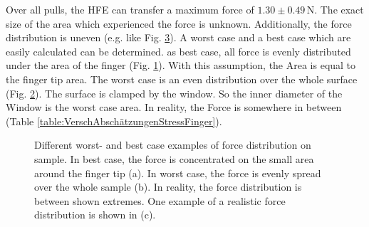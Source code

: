 Over all pulls, the HFE can transfer a maximum force of $1.30\pm0.49\,\si{\newton}$. The exact size of the area which experienced the force is unknown. Additionally, the force distribution is uneven (e.g. like Fig. \ref{fig:ZeichnungBerechnungStress_c}). A worst case and a best case which are easily calculated can be determined. as best case, all force is evenly distributed under the area of the finger (Fig. \ref{fig:ZeichnungBerechnungStress_a}). With this assumption, the Area is equal to the finger tip area. The worst case is an even distribution over the whole surface (Fig. \ref{fig:ZeichnungBerechnungStress_b}). The surface is clamped by the window. So the inner diameter of the Window is the worst case area. In reality, the Force is somewhere in between (Table \ref{table:VerschAbschätzungenStressFinger}).

\begin{figure}[hbt!]
	\centering
	\begin{subfigure}[]{0.3\textwidth}
		\centering
		
		\caption{}
		\label{fig:ZeichnungBerechnungStress_a}
	\end{subfigure}
	\begin{subfigure}[]{0.3\textwidth}
		\centering
		
		\caption{}
		\label{fig:ZeichnungBerechnungStress_b}
	\end{subfigure}
	\begin{subfigure}[]{0.3\textwidth}
		\centering
		
		\caption{}
		\label{fig:ZeichnungBerechnungStress_c}
	\end{subfigure}
	\caption{Different worst- and best case examples of force distribution on sample. In best case, the force is concentrated on the small area around the finger tip (a). In worst case, the force is evenly spread over the whole sample (b). In reality, the force distribution is between shown extremes. One example of a realistic force distribution is shown in (c).}
	\label{fig:ZeichnungBerechnungStress}
\end{figure}


